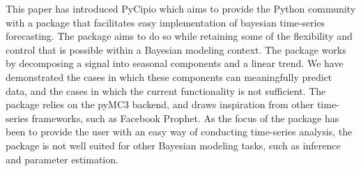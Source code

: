 \documentclass{article}
\begin{document}
\noindent This paper has introduced PyCipio which aims to provide the Python community with a package that facilitates easy implementation of bayesian time-series forecasting. The package aims to do so while retaining some of the flexibility and control that is possible within a Bayesian modeling context. The package works by decomposing a signal into seasonal components and a linear trend. We have demonstrated the cases in which these components can meaningfully predict data, and the cases in which the current functionality is not sufficient. The package relies on the pyMC3 backend, and draws inspiration from other time-series frameworks, such as Facebook Prophet. As the focus of the package has been to provide the user with an easy way of conducting time-series analysis, the package is not well suited for other Bayesian modeling tasks, such as inference and parameter estimation. 




\end{document}
